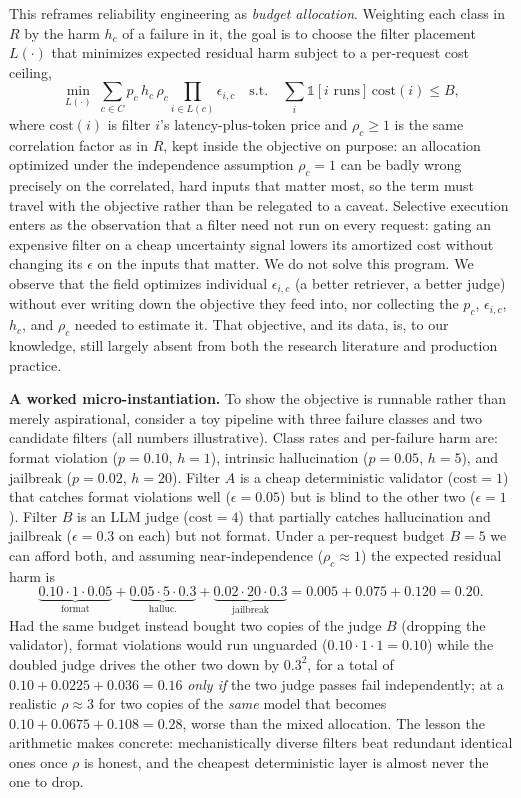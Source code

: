 \documentclass[11pt]{article}
\begin{document}
This reframes reliability engineering as \emph{budget allocation}. Weighting each
class in $R$ by the harm $h_c$ of a failure in it, the goal is to choose the
filter placement $L(\cdot)$ that minimizes expected residual harm subject to a
per-request cost ceiling,
\[
  \min_{L(\cdot)} \ \sum_{c \in C} p_c\, h_c\, \rho_c \!\!\prod_{i \in L(c)} \epsilon_{i,c}
  \quad \text{s.t.} \quad \sum_{i} \mathbb{1}[i \text{ runs}]\,\mathrm{cost}(i) \le B,
\]
where $\mathrm{cost}(i)$ is filter $i$'s latency-plus-token price and $\rho_c \ge 1$
is the same correlation factor as in $R$, kept inside the objective on purpose: an
allocation optimized under the independence assumption $\rho_c = 1$ can be badly
wrong precisely on the correlated, hard inputs that matter most, so the term must
travel with the objective rather than be relegated to a caveat. Selective
execution enters as the observation that a filter need not run on every request:
gating an expensive filter on a cheap uncertainty signal lowers its amortized
cost without changing its $\epsilon$ on the inputs that matter. We do not solve
this program. We observe that the field optimizes individual $\epsilon_{i,c}$ (a
better retriever, a better judge) without ever writing down the objective they
feed into, nor collecting the $p_c$, $\epsilon_{i,c}$, $h_c$, and $\rho_c$ needed
to estimate it. That objective, and its data, is, to our knowledge, still largely
absent from both the research literature and production practice.

\textbf{A worked micro-instantiation.} To show the objective is runnable rather
than merely aspirational, consider a toy pipeline with three failure classes and
two candidate filters (all numbers illustrative). Class rates and per-failure harm
are: format violation ($p=0.10$, $h=1$), intrinsic hallucination ($p=0.05$,
$h=5$), and jailbreak ($p=0.02$, $h=20$). Filter $A$ is a cheap deterministic
validator ($\mathrm{cost}=1$) that catches format violations well
($\epsilon=0.05$) but is blind to the other two ($\epsilon=1$). Filter $B$ is an
LLM judge ($\mathrm{cost}=4$) that partially catches hallucination and jailbreak
($\epsilon=0.3$ on each) but not format. Under a per-request budget $B=5$ we can
afford both, and assuming near-independence ($\rho_c \approx 1$) the expected
residual harm is
\[
  \underbrace{0.10\cdot1\cdot0.05}_{\text{format}}
  +\underbrace{0.05\cdot5\cdot0.3}_{\text{halluc.}}
  +\underbrace{0.02\cdot20\cdot0.3}_{\text{jailbreak}}
  = 0.005 + 0.075 + 0.120 = 0.20 .
\]
Had the same budget instead bought two copies of the judge $B$ (dropping the
validator), format violations would run unguarded ($0.10\cdot1\cdot1 = 0.10$)
while the doubled judge drives the other two down by $0.3^2$, for a total of
$0.10 + 0.0225 + 0.036 = 0.16$ \emph{only if} the two judge passes fail
independently; at a realistic $\rho \approx 3$ for two copies of the \emph{same}
model that becomes $0.10 + 0.0675 + 0.108 = 0.28$, worse than the mixed
allocation. The lesson the arithmetic makes concrete: mechanistically diverse
filters beat redundant identical ones once $\rho$ is honest, and the cheapest
deterministic layer is almost never the one to drop.
\end{document}
